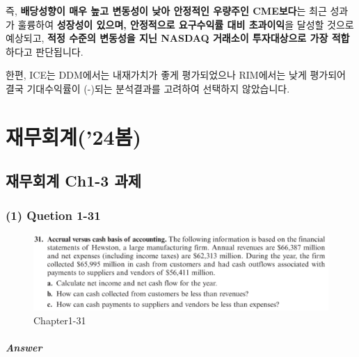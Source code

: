 \documentclass[
  letterpaper,
  DIV=11,
  numbers=noendperiod]{scrreprt}
\begin{document}
즉, \textbf{배당성향이 매우 높고 변동성이 낮아 안정적인 우량주인
CME보다}는 최근 성과가 훌륭하여 \textbf{성장성이 있으며, 안정적으로
요구수익률 대비 초과이익}을 달성할 것으로 예상되고, \textbf{적정 수준의
변동성을 지닌 NASDAQ 거래소이 투자대상으로 가장 적합}하다고 판단됩니다.

한편, ICE는 DDM에서는 내재가치가 좋게 평가되었으나 RIM에서는 낮게
평가되어 결국 기대수익률이 (-)되는 분석결과를 고려하여 선택하지
않았습니다.

\part{재무회계('24봄)}

\chapter*{재무회계 Ch1-3
과제}\label{uxc7acuxbb34uxd68cuxacc4-ch1-3-uxacfcuxc81c}


\section*{(1) Quetion 1-31}\label{quetion-1-31}


\begin{figure}[H]

{\centering \includegraphics{images/재무회계_hw2_1-31.png}

}

\caption{Chapter1-31}

\end{figure}%

\subsection*{\texorpdfstring{\textbf{\emph{Answer}}}{Answer}}\label{answer-5}
\end{document}
